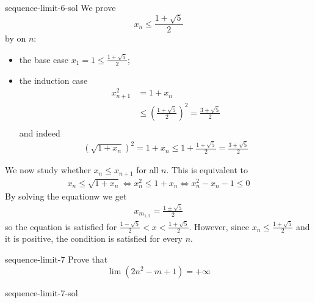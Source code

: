 \documentclass[preview]{standalone}
\begin{document}
\begin{snippetsolution}{sequence-limit-6-sol}{}
    We prove
    \[
        x_n \leq \frac{1+\sqrt{5}}{2}
    \]
    by \principleofinduction[induction] on \(n\):
    \begin{itemize}
        \item the base case \(x_1 = 1 \leq \frac{1+\sqrt{5}}{2}\);
        \item the induction case
        \begin{align*}
            x_{n+1}^2 &= 1 + x_n \\
            &\leq {\left(\frac{1+\sqrt{5}}{2}\right)}^2 = \frac{3 + \sqrt{5}}{2} \\
        \end{align*}
        and indeed
        \begin{align*}
            {\left(\sqrt{1 + x_n}\right)}^2 = 1 + x_n \leq 1 + \frac{1 + \sqrt{5}}{2}
            = \frac{3 + \sqrt{5}}{2}
        \end{align*}
    \end{itemize}
    We now study whether \(x_n \leq x_{n+1}\) for all \(n\).
    This is equivalent to
    \begin{align*}
        x_n \leq \sqrt{1 + x_n} \iff x_n^2 \leq 1 + x_n
        \iff x_n^2 - x_n - 1 \leq 0
    \end{align*}
    By solving the equationw we get
    \begin{align*}
        x_{m_{1,2}} = \frac{1 \pm \sqrt{5}}{2}
    \end{align*}
    so the equation is satisfied for \(\frac{1 - \sqrt{5}}{2} < x < \frac{1 + \sqrt{5}}{2}\).
    However, since \(x_n \leq \frac{1 + \sqrt{5}}{2}\)
    and it is positive, the condition is satisfied for every \(n\).
\end{snippetsolution}

\begin{snippetexercise}{sequence-limit-7}{}
    Prove that
    \[
        \lim \left(2n^2 - m + 1\right) = +\infty
    \]
\end{snippetexercise}

\begin{snippetsolution}{sequence-limit-7-sol}{}
    \todo
\end{snippetsolution}
\end{document}
